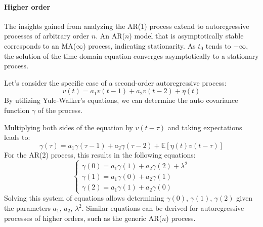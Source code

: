 \paragraph*{Higher order}
The insights gained from analyzing the AR(1) process extend to autoregressive processes of arbitrary order $n$. 
An AR($n$) model that is asymptotically stable corresponds to an MA($\infty$) process, indicating stationarity.
As $t_0$ tends to $-\infty$, the solution of the time domain equation converges asymptotically to a stationary process.

Let's consider the specific case of a second-order autoregressive process:
\[v(t) = a_1v(t-1) + a_2v(t-2) + \eta(t)\]
By utilizing Yule-Walker's equations, we can determine the auto covariance function $\gamma$ of the process.  

Multiplying both sides of the equation by $v(t-\tau)$ and taking expectations leads to:
\[\gamma(\tau)=a_1\gamma(\tau-1)+a_2\gamma(\tau-2)+\mathbb{E}\left[ \eta(t)v(t-\tau) \right]\]
For the AR(2) process, this results in the following equations:
\[ \begin{cases}
    \gamma(0) = a_1\gamma(1) + a_2\gamma(2) + \lambda^2 \\
    \gamma(1) = a_1\gamma(0) + a_2\gamma(1) \\ 
    \gamma(2) = a_1\gamma(1) + a_2\gamma(0)
\end{cases} \]
Solving this system of equations allows determining $\gamma(0)$, $\gamma(1)$, $\gamma(2)$ given the parameters $a_1$, $a_2$, $\lambda^2$.
Similar equations can be derived for autoregressive processes of higher orders, such as the generic AR($n$) process.

